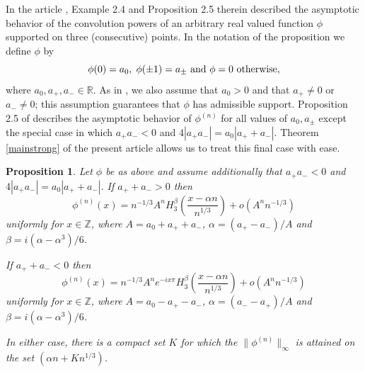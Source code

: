 \documentclass{article}
\theoremstyle{theorem}
\newtheorem{proposition}[theorem]{Proposition}
\theoremstyle{remark}
\begin{document}
\noindent In the article \cite{DSC1}, Example 2.4 and Proposition 2.5 therein described the asymptotic behavior of the convolution powers of an arbitrary real valued function $\phi$ supported on three (consecutive) points.  In the notation of the proposition we define $\phi$ by 
\begin{equation}
 \phi(0)=a_0,\hspace{.1cm}\phi(\pm 1)=a_{\pm}\mbox{ and }\phi=0\mbox{ otherwise},
\end{equation}
where $a_0,a_{+},a_{-}\in\mathbb{R}$. As in \cite{DSC1}, we also assume that $a_0>0$ and that $a_+\neq 0$ or $a_{-}\neq 0$; this assumption guarantees that $\phi$ has admissible support. Proposition 2.5 of \cite{DSC1} describes the asymptotic behavior of $\phi^{(n)}$ for all values of $a_0, a_{\pm}$ except the special case in which $a_{+}a_{-}<0$ and $4|a_{+}a_{-}|=a_0|a_{+}+a_{-}|.$ Theorem \ref{mainstrong} of the present article allows us to treat this final case with ease. 
\begin{proposition}
Let $\phi$ be as above and assume additionally that $a_{+}a_{-}<0$ and $4|a_{+}a_{-}|=a_0|a_{+}+a_{-}|.$ If $a_{+}+a_{-}>0$ then
\begin{equation}\label{threepointconclusion1}
\phi^{(n)}(x)=n^{-1/3}A^n H_3^{\beta}\left(\frac{x-\alpha n}{n^{1/3}}\right)+o(A^n n^{-1/3})
\end{equation}
uniformly for $x\in\mathbb{Z}$, where $A=a_0+a_{+} +a_{-}$, $\alpha=(a_{+}-a_{-})/A$ and $\beta=i(\alpha-\alpha^3)/6$.
 
If  $a_{+}+a_{-}<0$ then
\begin{equation}
\phi^{(n)}(x)=n^{-1/3}A^n e^{-ix\pi} H_3^{\beta}\left(\frac{x-\alpha n}{n^{1/3}}\right)+o(A^n n^{-1/3})
\end{equation}
uniformly for $x\in\mathbb{Z}$, where $A=a_0-a_{+} -a_{-}$, $\alpha=(a_{-}-a_{+})/A$ and $\beta=i(\alpha-\alpha^3)/6$.

In either case, there is a compact set $K$ for which the $\|\phi^{(n)}\|_\infty$ is attained on the set $(\alpha n+Kn^{1/3})$.
\end{proposition}
\end{document}
